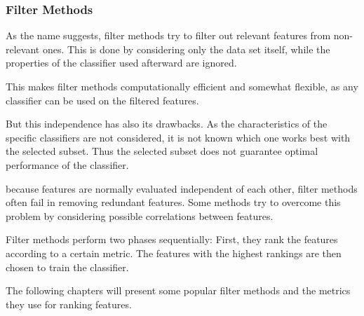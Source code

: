 \subsubsection{Filter Methods}
\label{sec:methods.flat.filter}


As the name suggests, filter methods try to filter out relevant features from
non-relevant ones. This is done by considering only the data set itself, while
the properties of the classifier used afterward are ignored.
 
This makes filter methods computationally efficient and somewhat flexible, 
as any classifier can be used on the filtered features.  

But this independence has also its drawbacks. As the characteristics of the 
specific classifiers are not considered, it is not known which one works 
best with the selected subset. Thus the selected subset does not guarantee optimal 
performance of the classifier.

because features are normally evaluated independent of each other, filter methods often
fail in removing redundant features. Some methods try to overcome this problem by 
considering possible correlations between features.

Filter methods perform two phases sequentially: First, they rank the features according 
to a certain metric. The features with the highest rankings are then chosen to train the
classifier. 

The following chapters will present some popular filter methods and the metrics they use
for ranking features.



